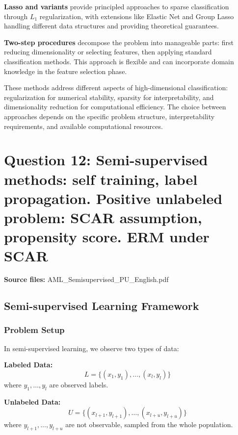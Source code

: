 \documentclass[12pt,a4paper]{article}
\begin{document}
\textbf{Lasso and variants} provide principled approaches to sparse classification through $L_1$ regularization, with extensions like Elastic Net and Group Lasso handling different data structures and providing theoretical guarantees.

\textbf{Two-step procedures} decompose the problem into manageable parts: first reducing dimensionality or selecting features, then applying standard classification methods. This approach is flexible and can incorporate domain knowledge in the feature selection phase.

These methods address different aspects of high-dimensional classification: regularization for numerical stability, sparsity for interpretability, and dimensionality reduction for computational efficiency. The choice between approaches depends on the specific problem structure, interpretability requirements, and available computational resources.

\newpage
\section{Question 12: Semi-supervised methods: self training, label propagation. Positive unlabeled problem: SCAR assumption, propensity score. ERM under SCAR}

\textbf{Source files:} AML\_Semisupervised\_PU\_English.pdf

\subsection{Semi-supervised Learning Framework}

\subsubsection{Problem Setup}

In semi-supervised learning, we observe two types of data:

\textbf{Labeled Data:}
\begin{equation}
L = \{(x_1, y_1), \ldots, (x_l, y_l)\}
\end{equation}
where $y_1, \ldots, y_l$ are observed labels.

\textbf{Unlabeled Data:}
\begin{equation}
U = \{(x_{l+1}, y_{l+1}), \ldots, (x_{l+u}, y_{l+u})\}
\end{equation}
where $y_{l+1}, \ldots, y_{l+u}$ are not observable, sampled from the whole population.
\end{document}
